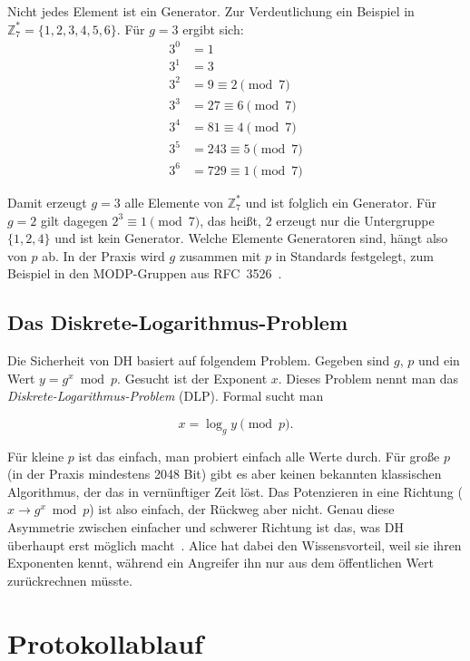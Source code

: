 \documentclass[conference]{IEEEtran}
\begin{document}
Nicht jedes Element ist ein Generator. Zur Verdeutlichung ein
Beispiel in $\mathbb{Z}_7^* = \{1, 2, 3, 4, 5, 6\}$. Für $g = 3$
ergibt sich:
\begin{align*}
3^0 &= 1 \\
3^1 &= 3 \\
3^2 &= 9 \equiv 2 \pmod 7 \\
3^3 &= 27 \equiv 6 \pmod 7 \\
3^4 &= 81 \equiv 4 \pmod 7 \\
3^5 &= 243 \equiv 5 \pmod 7 \\
3^6 &= 729 \equiv 1 \pmod 7
\end{align*}

Damit erzeugt $g = 3$ alle Elemente von $\mathbb{Z}_7^*$ und ist
folglich ein Generator. Für $g = 2$ gilt dagegen $2^3 \equiv 1 \pmod
7$, das heißt, $2$ erzeugt nur die Untergruppe $\{1, 2, 4\}$ und ist
kein Generator. Welche Elemente Generatoren sind, hängt also von $p$
ab. In der Praxis wird $g$ zusammen mit $p$ in Standards festgelegt,
zum Beispiel in den MODP-Gruppen aus RFC~3526~\cite{rfc3526}.

\subsection{Das Diskrete-Logarithmus-Problem}

Die Sicherheit von DH basiert auf folgendem Problem. Gegeben sind
$g$, $p$ und ein Wert $y = g^x \bmod p$. Gesucht ist der Exponent
$x$. Dieses Problem nennt man das \emph{Diskrete-Logarithmus-Problem}
(DLP). Formal sucht man

\begin{equation}
    x = \log_g y \pmod p.
\end{equation}

Für kleine $p$ ist das einfach, man probiert einfach alle Werte
durch. Für große $p$ (in der Praxis mindestens 2048 Bit) gibt es
aber keinen bekannten klassischen Algorithmus, der das in vernünftiger
Zeit löst. Das Potenzieren in eine Richtung ($x \to g^x \bmod p$) ist
also einfach, der Rückweg aber nicht. Genau diese Asymmetrie zwischen
einfacher und schwerer Richtung ist das, was DH überhaupt erst
möglich macht~\cite{cfrg-dh}. Alice hat dabei den Wissensvorteil,
weil sie ihren Exponenten kennt, während ein Angreifer ihn nur aus
dem öffentlichen Wert zurückrechnen müsste.

\section{Protokollablauf}
\end{document}
